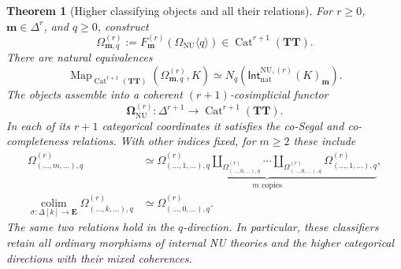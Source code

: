 \documentclass[oneside]{article}
\theoremstyle{plain}
\newtheorem{theorem}{Theorem}[section]
\theoremstyle{definition}
\theoremstyle{remark}
\newcommand{\Map}{\operatorname{Map}}
\newcommand{\NU}{\mathrm{NU}}
\newcommand{\TT}{\mathbf{TT}}
\begin{document}
\begin{theorem}[Higher classifying objects and all their relations]
\label{thm:stratified-higher-classifiers}
For $r\geq0$, $\mathbf m\in\Delta^r$, and $q\geq0$, construct
\begin{equation}\label{eq:stratified-higher-classifier}
 \Omega^{(r)}_{\mathbf m,q}
 :=F^{(r)}_{\mathbf m}(\Omega_{\NU}\langle q\rangle)
 \in\operatorname{Cat}^{r+1}(\TT).
\end{equation}
There are natural equivalences
\begin{equation}\label{eq:stratified-higher-classifier-UP}
 \Map_{\operatorname{Cat}^{r+1}(\TT)}
 (\Omega^{(r)}_{\mathbf m,q},K)
 \simeq
 N_q\!\left(\mathsf{Int}^{\NU,(r)}_{\mathrm{nat}}(K)_{\mathbf m}\right).
\end{equation}
The objects assemble into a coherent $(r+1)$-cosimplicial functor
\begin{equation}\label{eq:stratified-higher-cosimplicial}
 \boldsymbol\Omega^{(r)}_{\NU}:
 \Delta^{r+1}\longrightarrow\operatorname{Cat}^{r+1}(\TT).
\end{equation}
In each of its $r+1$ categorical coordinates it satisfies the
co-Segal and co-completeness relations.  With other indices fixed,
for $m\geq2$ these include
\begin{align}
 \Omega^{(r)}_{(\ldots,m,\ldots),q}
 &\simeq
 \underbrace{\Omega^{(r)}_{(\ldots,1,\ldots),q}
 \amalg_{\Omega^{(r)}_{(\ldots,0,\ldots),q}}\cdots
 \amalg_{\Omega^{(r)}_{(\ldots,0,\ldots),q}}
 \Omega^{(r)}_{(\ldots,1,\ldots),q}}_{m\text{ copies}},
 \label{eq:stratified-higher-coSegal}\\
 \operatorname*{colim}_{\sigma:\Delta[k]\to\mathbf E}
 \Omega^{(r)}_{(\ldots,k,\ldots),q}
 &\simeq\Omega^{(r)}_{(\ldots,0,\ldots),q}.
 \label{eq:stratified-higher-coComplete}
\end{align}
The same two relations hold in the $q$-direction.  In particular,
these classifiers retain all ordinary morphisms of internal NU
theories and the higher categorical directions with their mixed
coherences.
\end{theorem}
\end{document}

